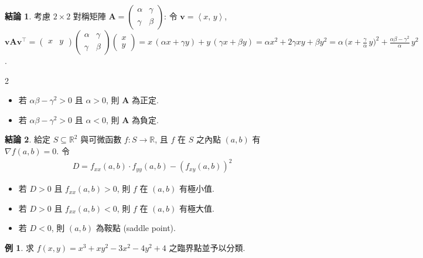 \documentclass[12pt]{extarticle}
\newcommand{\ds}{\displaystyle}
\newcommand{\llt}{\left\langle}
\newcommand{\rgt}{\right\rangle}
\theoremstyle{definition}
\newtheorem*{fact}{結論}
\newtheorem*{ex}{例}
\newcommand{\vv}{\mathbf{v}}
\newcommand{\vA}{\mathbf{A}}
\begin{document}
\begin{fact}
  考慮 $2\times 2$ 對稱矩陣 $\ds\vA = \begin{pmatrix}\alpha & \gamma\\ \gamma & \beta\end{pmatrix}$: 令 $\ds\vv = \llt x,\,y\rgt$, $\ds\vv\vA\vv^\top = \begin{pmatrix}x & y\end{pmatrix}\begin{pmatrix}\alpha & \gamma\\ \gamma & \beta\end{pmatrix}\begin{pmatrix}x\\y\end{pmatrix} = x\,(\alpha x + \gamma y) + y\,(\gamma x + \beta y) = \alpha x^2 + 2\gamma xy + \beta y^2 = \alpha\,\Big(x + \frac{\gamma}{\alpha}\,y\Big)^2 + \frac{\alpha\beta - \gamma^2}{\alpha}\,y^2$.
  \begin{multicols}{2}
    \begin{itemize}\setlength\itemsep{0em}
      \item 若 $\ds \alpha\beta - \gamma^2 > 0$ 且 $\ds \alpha > 0$, 則 $\vA$ 為正定. 
      \item 若 $\ds \alpha\beta - \gamma^2 > 0$ 且 $\ds \alpha < 0$, 則 $\vA$ 為負定. 
    \end{itemize}
  \end{multicols}
\end{fact}

\begin{fact}
  給定 $\ds S\subseteq\mathbb{R}^2$ 與可微函數 $\ds f:S\to\mathbb{R}$, 且 $f$ 在 $S$ 之內點 $(a, b)$ 有 $\ds\nabla f(a, b) = 0$. 令 
  \begin{align*}
    D = f_{xx}(a, b)\cdot f_{yy}(a, b) - (f_{xy}(a, b))^2
  \end{align*}
  \begin{itemize}\setlength\itemsep{0em}
    \item 若 $D > 0$ 且 $\ds f_{xx}(a, b) > 0$, 則 $f$ 在 $(a, b)$ 有極小值. 
    \item 若 $D > 0$ 且 $\ds f_{xx}(a, b) < 0$, 則 $f$ 在 $(a, b)$ 有極大值. 
    \item 若 $D < 0$, 則 $(a, b)$ 為鞍點 (saddle point). 
  \end{itemize}
\end{fact}

\begin{ex} 
  求 $\ds f(x, y) = x^3 + xy^2 - 3x^2 - 4y^2 + 4$ 之臨界點並予以分類. 
\end{ex}
\end{document}
